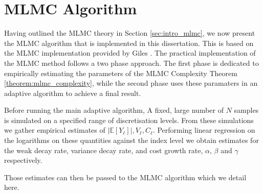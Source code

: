 \section{MLMC Algorithm}

Having outlined the MLMC theory in Section \ref{sec:intro_mlmc}, we now present 
the MLMC algorithm that is implemented in this dissertation. This is 
based on the MLMC implementation provided by Giles \cite{giles2015multilevel}.
The practical implementation of the MLMC method follows a two phase approach.
The first phase is dedicated to empirically estimating the parameters 
of the MLMC Complexity Theorem \ref{theorem:mlmc_complexity}, while the
second phase uses these paramaters in an adaptive algorithm 
to achieve a final result.

Before running the main adaptive algorithm, A fixed, large number of $N$ 
samples is simulated on a specified range of discretisation levels. From 
these simulations we gather empirical estimates of $|\mathbb{E}[Y_\ell]|, 
V_\ell, C_\ell$. Performing linear regression on the logarithms on these
quantities against the index level we obtain estimates for the weak decay rate,
variance decay rate, and cost growth rate, $\alpha$, $\beta$ and $\gamma$ 
respectively. 

Those estimates can then be passed to the MLMC algorithm which we detail here.

